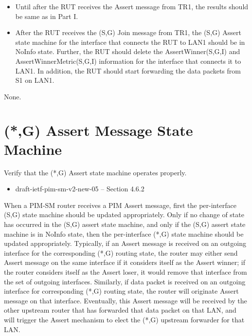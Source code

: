 \documentclass[11pt]{report}
\begin{document}

\begin{itemize}

  \item Until after the RUT receives the Assert message from TR1, the
  results should be same as in Part I.

  \item After the RUT receives the (S,G) Join message from TR1, the (S,G)
  Assert state machine for the interface that connects the RUT to LAN1 should
  be in NoInfo state.
  Further, the RUT should delete the AssertWinner(S,G,I) and
  AssertWinnerMetric(S,G,I) information for the interface that connects it to
  LAN1.
  In addition, the RUT should start forwarding the data packets from S1 on
  LAN1.

\end{itemize}

None.

\newpage
\section{(*,G) Assert Message State Machine}

Verify that the (*,G) Assert state machine operates properly.

\begin{itemize}
  \item draft-ietf-pim-sm-v2-new-05 -- Section 4.6.2
\end{itemize}

When a PIM-SM router receives a PIM Assert message, first the per-interface
(S,G) state machine should be updated appropriately. Only if no change of
state has occurred in the (S,G) assert state machine, and only if the (S,G)
assert state machine is in NoInfo state, then the per-interface
(*,G) state machine should be updated appropriately. Typically, if an
Assert message is received on an outgoing interface for the corresponding
(*,G) routing state, the router may either send Assert message on the
same interface if it considers itself as the Assert winner; if the router
considers itself as the Assert loser, it would remove that interface from the
set of outgoing interfaces. Similarly, if data packet is received on an
outgoing interface for corresponding (*,G) routing state, the router will
originate Assert message on that interface. Eventually, this Assert message
will be received by the other upstream router that has forwarded that data
packet on that LAN, and will trigger the Assert mechanism to elect the (*,G)
upstream forwarder for that LAN.
\end{document}
